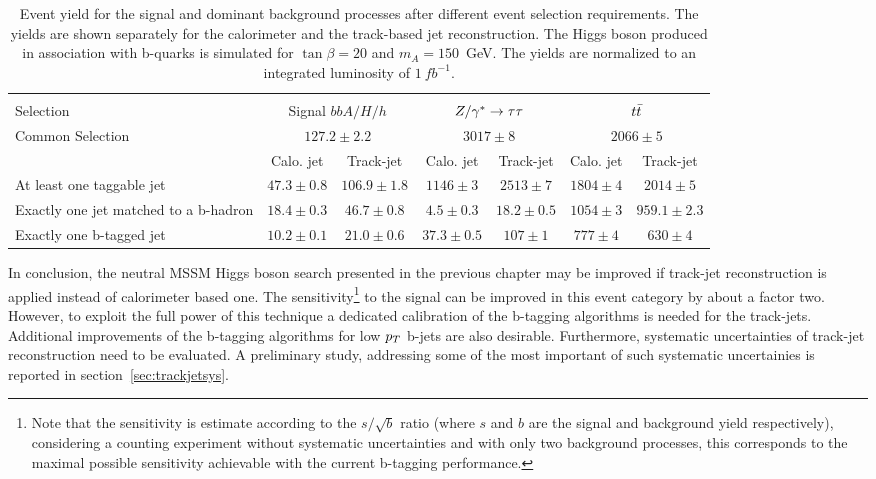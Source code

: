 \begin{table}[tp]
	\caption{Event yield for the signal and dominant background processes after different event selection requirements.
	The yields are shown separately for the calorimeter and the  track-based jet reconstruction.
	The Higgs boson produced in association with b-quarks is simulated for  $\tan\beta=20$ and $m_A=150$~GeV. The yields
		are normalized to an integrated luminosity of $1 ~ fb^{-1}$.}
	\vspace{3mm}

	\begin{footnotesize}
	\begin{tabular}{p{3.0cm} |c c| c c| c c }
	\hline
	\hline\\ 
Selection 	& 	\multicolumn{2}{|c|}{Signal $bbA/H/h$ }	&\multicolumn{2}{c|}{$Z/\gamma^*\rightarrow \tau\tau$}	& \multicolumn{2}{c}{$t\bar{t}$}	\\
	[0.5cm]
	\hline
Common Selection	&	\multicolumn{2}{|c|}{$127.2 \pm 2.2$} &\multicolumn{2}{c|}{$3017 \pm 8$} &\multicolumn{2}{c}{$2066 \pm 5$} \\[0.5cm]
			&	Calo. jet		&	Track-jet &Calo. jet	&Track-jet	&Calo. jet	&Track-jet \\[0.5cm]
At least one taggable jet& $47.3 \pm0.8$	&$106.9 \pm1.8$	 &$1146 \pm3 $	&$2513 \pm 7$	&$1804 \pm 4$	&$2014 \pm 5$ \\[1cm]
Exactly one jet matched to a b-hadron& $18.4 \pm 0.3$ & $46.7 \pm 0.8$ & $4.5 \pm 0.3$	&$18.2 \pm 0.5$ 	&$1054 \pm 3$	&$959.1 \pm 2.3$  \\[1cm]
Exactly one b-tagged jet&	$10.2 \pm0.1$	&$21.0 \pm 0.6$	& $37.3 \pm 0.5$ &$107 \pm 1$ &$777 \pm 4$	&$630 \pm4$ \\[1cm]
	\hline
	\hline
	
	\end{tabular}
	\end{footnotesize}
	\label{tab:tj_cj}
\end{table}

In conclusion, the neutral MSSM Higgs boson search presented in the previous chapter may be improved if track-jet
reconstruction is applied instead of calorimeter based one.
The sensitivity\footnote{Note that the sensitivity is estimate according to the $s/\sqrt{b}$ ratio (where $s$ and 
$b$ are the signal and background yield respectively), considering a counting experiment without systematic uncertainties and 
with only two background processes, this corresponds to the maximal possible sensitivity achievable 
 with the current b-tagging performance.} 
to the signal can be improved in this event
category by about a factor two. However, to exploit the full power of this technique a dedicated calibration of the 
b-tagging algorithms is  needed for the track-jets. Additional improvements of the b-tagging algorithms 
for low $p_{T}$ b-jets are also desirable. Furthermore, 
systematic uncertainties of track-jet reconstruction need to be evaluated. A preliminary study, addressing some
 of the most important of such systematic uncertainies is reported in section~\ref{sec:trackjetsys}.
 

